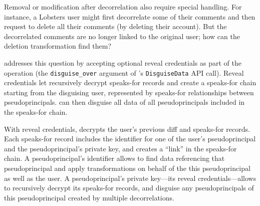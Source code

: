 %
%

Removal or modification after decorrelation also require special handling. For
instance, a Lobsters user might first decorrelate some of their comments and
then request to delete all their comments (\eg by deleting their account).
%
But the decorrelated comments are no
longer linked to the original user; how can the deletion transformation find
them?
%

%
\sys addresses this question by accepting optional reveal credentials as part of
the \xx operation (the \texttt{disguise\_over} argument of \sys's
\texttt{DisguiseData} API call).
%
Reveal credentials let \sys recursively decrypt speaks-for records and create a
speaks-for chain starting from the disguising user, represented by speaks-for
relationships between pseudoprincipals. \sys can then disguise all data of all
pseudoprincipals included in the speaks-for chain.
%

With reveal credentials, \sys decrypts the user's previous diff and speaks-for
records. Each speaks-for record includes the identifier for one of the user's
pseudoprincipal and the pseudoprincipal's private key, and creates a ``link'' in
the speaks-for chain. A pseudoprincipal's identifier allows \sys to find data
referencing that pseudoprincipal and apply \xxing transformations on behalf of
the this pseudoprincipal as well as the user. 
%
A pseudoprincipal's private key---its reveal credentials---allows \sys to
recursively decrypt its speaks-for records, and disguise any pseudoprincipals of
this pseudoprincipal created by multiple decorrelations.
%


